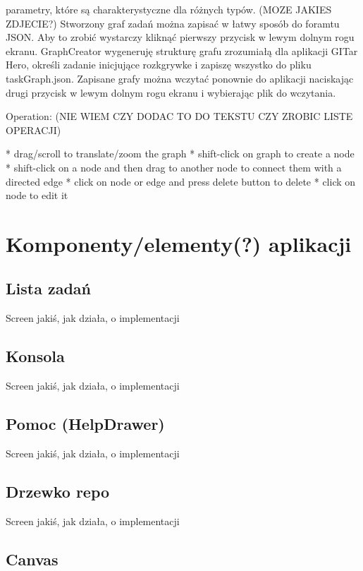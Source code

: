 \documentclass[11pt,a4paper,polish,thesis]{dcsbook}
\begin{document}
parametry, które są charakterystyczne dla różnych typów. (MOZE JAKIES ZDJECIE?) Stworzony graf zadań można zapisać w łatwy sposób do foramtu JSON. Aby to zrobić wystarczy kliknąć pierwszy przycisk w lewym dolnym rogu ekranu. GraphCreator wygeneruję strukturę grafu zrozumiałą dla aplikacji GITar Hero, określi zadanie inicjujące rozkgrywke i zapiszę wszystko do pliku taskGraph.json. Zapisane grafy można wczytać ponownie do aplikacji naciskając drugi przycisk w lewym dolnym rogu ekranu i wybierając plik do wczytania.
	
	Operation: (NIE WIEM CZY DODAC TO DO TEKSTU CZY ZROBIC LISTE OPERACJI)
	
	* drag/scroll to translate/zoom the graph
	* shift-click on graph to create a node
	* shift-click on a node and then drag to another node to connect them with a directed edge
	* click on node or edge and press delete button to delete
	* click on node to edit it
	
	\section{Komponenty/elementy(?) aplikacji}
	
	\subsection{Lista zadań}
	
	Screen jakiś, jak działa, o implementacji
	
	\subsection{Konsola}
	
	Screen jakiś, jak działa, o implementacji
	
	\subsection{Pomoc (HelpDrawer)}
	
	Screen jakiś, jak działa, o implementacji
	
	\subsection{Drzewko repo}
	
	Screen jakiś, jak działa, o implementacji
	
	\subsection{Canvas}
	
\end{document}
